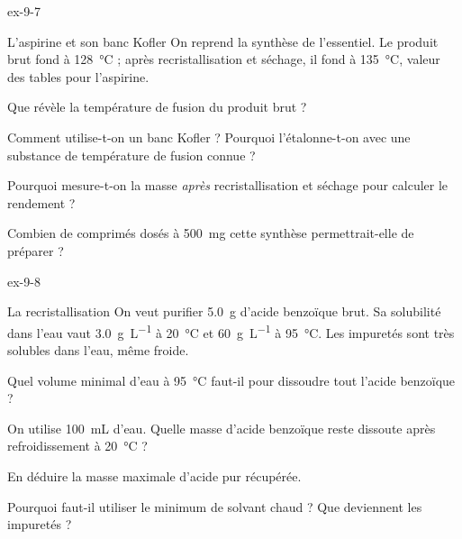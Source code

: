 \begin{blocLivre}{ex-9-7}
\begin{exercice}[2]{L'aspirine et son banc Kofler}
On reprend la synthèse de l'essentiel. Le produit brut fond à \qty{128}{\degreeCelsius} ; après recristallisation et séchage, il fond
à \qty{135}{\degreeCelsius}, valeur des tables pour l'aspirine.
\begin{questions}
\item Que révèle la température de fusion du produit brut ?
\item Comment utilise-t-on un banc Kofler ? Pourquoi l'étalonne-t-on avec une substance de température de fusion connue ?
\item Pourquoi mesure-t-on la masse \emph{après} recristallisation et séchage pour calculer le rendement ?
\item Combien de comprimés dosés à \qty{500}{mg} cette synthèse permettrait-elle de préparer ?
\end{questions}
\end{exercice}
\end{blocLivre}
\begin{blocLivre}{ex-9-8}
\begin{exercice}[2]{La recristallisation}
On veut purifier \qty{5,0}{g} d'acide benzoïque brut. Sa solubilité dans l'eau vaut \qty{3,0}{g.L^{-1}} à \qty{20}{\degreeCelsius} et \qty{60}{g.L^{-1}} à
\qty{95}{\degreeCelsius}. Les impuretés sont très solubles dans l'eau, même froide.
\begin{questions}
\item Quel volume minimal d'eau à \qty{95}{\degreeCelsius} faut-il pour dissoudre tout l'acide benzoïque ?
\item On utilise \qty{100}{mL} d'eau. Quelle masse d'acide benzoïque reste dissoute après refroidissement à \qty{20}{\degreeCelsius} ?
\item En déduire la masse maximale d'acide pur récupérée.
\item Pourquoi faut-il utiliser le minimum de solvant chaud ? Que deviennent les impuretés ?
\end{questions}
\end{exercice}
\end{blocLivre}

